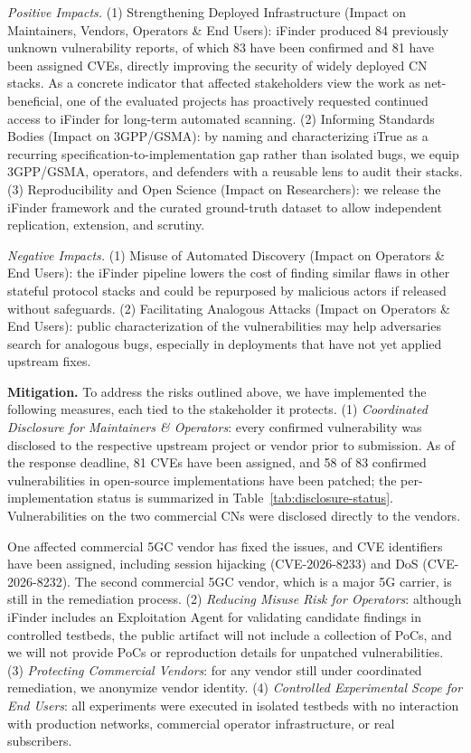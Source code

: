 \noindent\textit{Positive Impacts.} (1) Strengthening Deployed Infrastructure (Impact on Maintainers, Vendors, Operators \& End Users): iFinder produced 84 previously unknown vulnerability reports, of which 83 have been confirmed and 81 have been assigned CVEs, directly improving the security of widely deployed CN stacks. As a concrete indicator that affected stakeholders view the work as net-beneficial, one of the evaluated projects has proactively requested continued access to iFinder for long-term automated scanning. (2) Informing Standards Bodies (Impact on 3GPP/GSMA): by naming and characterizing iTrue as a recurring specification-to-implementation gap rather than isolated bugs, we equip 3GPP/GSMA, operators, and defenders with a reusable lens to audit their stacks. (3) Reproducibility and Open Science (Impact on Researchers): we release the iFinder framework and the curated ground-truth dataset to allow independent replication, extension, and scrutiny.

\noindent\textit{Negative Impacts.} (1) Misuse of Automated Discovery (Impact on Operators \& End Users): the iFinder pipeline lowers the cost of finding similar flaws in other stateful protocol stacks and could be repurposed by malicious actors if released without safeguards. (2) Facilitating Analogous Attacks (Impact on Operators \& End Users): public characterization of the vulnerabilities may help adversaries search for analogous bugs, especially in deployments that have not yet applied upstream fixes.

\noindent\textbf{Mitigation.} To address the risks outlined above, we have implemented the following measures, each tied to the stakeholder it protects. 
(1) \textit{Coordinated Disclosure for Maintainers \& Operators}: every confirmed vulnerability was disclosed to the respective upstream project or vendor prior to submission. 
As of the response deadline, 81 CVEs have been assigned, and 58 of 83 confirmed vulnerabilities in open-source implementations have been patched; the per-implementation status is summarized in Table~\ref{tab:disclosure-status}.
Vulnerabilities on the two commercial CNs were disclosed directly to the vendors.

One affected commercial 5GC vendor has fixed the issues, and CVE identifiers have been assigned, including session hijacking (CVE-2026-8233) and DoS (CVE-2026-8232). 
The second commercial 5GC vendor, which is a major 5G carrier, is still in the remediation process.
(2) \textit{Reducing Misuse Risk for Operators}: although iFinder includes an Exploitation Agent for validating candidate findings in controlled testbeds, the public artifact will not include a collection of PoCs, and we will not provide PoCs or reproduction details for unpatched vulnerabilities. 
(3) \textit{Protecting Commercial Vendors}: for any vendor still under coordinated remediation, we anonymize vendor identity. 
(4) \textit{Controlled Experimental Scope for End Users}: all experiments were executed in isolated testbeds with no interaction with production networks, commercial operator infrastructure, or real subscribers.


